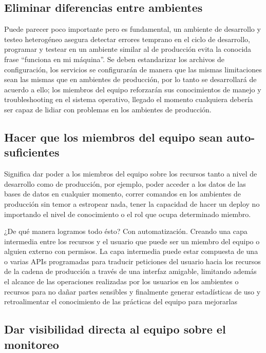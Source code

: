 \documentclass[conference]{IEEEtran}
\begin{document}
\subsection{Eliminar diferencias entre ambientes}

Puede parecer poco importante pero es fundamental, un ambiente de desarrollo y testeo heterogéneo asegura detectar errores temprano en el ciclo de desarrollo, programar y testear en un ambiente similar al de producción evita la conocida frase “funciona en mi máquina”. Se deben estandarizar los archivos de configuración, los servicios se configurarán de manera que las mismas limitaciones sean las mismas que en ambientes de producción, por lo tanto se desarrollará de acuerdo a ello; los miembros del equipo reforzarán sus conocimientos de manejo y troubleshooting en el sistema operativo, llegado el momento cualquiera debería ser capaz de lidiar con problemas en los ambientes de producción.

\subsection{Hacer que los miembros del equipo sean auto-suficientes}

Significa dar poder a los miembros del equipo sobre los recursos tanto a nivel de desarrollo como de producción, por ejemplo, poder acceder a los datos de las bases de datos en cualquier momento, correr comandos en los ambientes de producción sin temor a estropear nada, tener la capacidad de hacer un deploy no importando el nivel de conocimiento o el rol que ocupa determinado miembro.

¿De qué manera logramos todo ésto? Con automatización. Creando una capa intermedia entre los recursos y el usuario que puede ser un miembro del equipo o alguien externo con permisos. La capa intermedia puede estar compuesta de una o varias APIs programadas para traducir peticiones del usuario hacia los recursos de la cadena de producción a través de una interfaz amigable, limitando además el alcance de las operaciones realizadas por los usuarios en los ambientes o recursos para no dañar partes sensibles y finalmente generar estadísticas de uso y retroalimentar el conocimiento de las prácticas del equipo para mejorarlas

\subsection{Dar visibilidad directa al equipo sobre el monitoreo}
\end{document}
